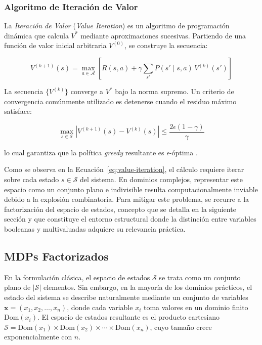 \subsubsection{Algoritmo de Iteración de Valor}

La \textit{Iteración de Valor} (\textit{Value Iteration}) es un algoritmo de programación dinámica que calcula $V^*$ mediante aproximaciones sucesivas. Partiendo de una función de valor inicial arbitraria $V^{(0)}$, se construye la secuencia:

\begin{equation}
    V^{(k+1)}(s) = \max_{a \in \mathcal{A}} \left[ R(s, a) + \gamma \sum_{s'} P(s' \mid s, a) \, V^{(k)}(s') \right]
    \label{eq:value-iteration}
\end{equation}

La secuencia $\{V^{(k)}\}$ converge a $V^*$ bajo la norma supremo. Un criterio de convergencia comúnmente utilizado es detenerse cuando el residuo máximo satisface:

\begin{equation}
    \max_{s \in \mathcal{S}} \left| V^{(k+1)}(s) - V^{(k)}(s) \right| \leq \frac{2 \epsilon (1 - \gamma)}{\gamma}
    \label{eq:convergence}
\end{equation}

lo cual garantiza que la política \textit{greedy} resultante es $\epsilon$-óptima \cite{puterman2014markov, sutton2018reinforcement}.

Como se observa en la Ecuación~\ref{eq:value-iteration}, el cálculo requiere iterar sobre cada estado $s \in \mathcal{S}$ del sistema. En dominios complejos, representar este espacio como un conjunto plano e indivisible resulta computacionalmente inviable debido a la explosión combinatoria. Para mitigar este problema, se recurre a la factorización del espacio de estados, concepto que se detalla en la siguiente sección y que constituye el entorno estructural donde la distinción entre variables booleanas y multivaluadas adquiere su relevancia práctica.

\clearpage
\subsection{MDPs Factorizados}
\label{sec:mt-factorizados}

En la formulación clásica, el espacio de estados $\mathcal{S}$ se trata como un conjunto plano de $|\mathcal{S}|$ elementos. Sin embargo, en la mayoría de los dominios prácticos, el estado del sistema se describe naturalmente mediante un conjunto de variables $\mathbf{x} = (x_1, x_2, \ldots, x_n)$, donde cada variable $x_i$ toma valores en un dominio finito $\text{Dom}(x_i)$. El espacio de estados resultante es el producto cartesiano $\mathcal{S} = \text{Dom}(x_1) \times \text{Dom}(x_2) \times \cdots \times \text{Dom}(x_n)$, cuyo tamaño crece exponencialmente con $n$.

